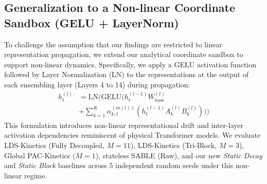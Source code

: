 \subsection{Generalization to a Non-linear Coordinate Sandbox (GELU + LayerNorm)}
To challenge the assumption that our findings are restricted to linear representation propagation, we extend our analytical coordinate sandbox to support non-linear dynamics. Specifically, we apply a GELU activation function followed by Layer Normalization (LN) to the representations at the output of each ensembling layer (Layers 4 to 14) during propagation:
\begin{equation}
\begin{aligned}
    h_t^{(l)} &= \text{LN}\Big( \text{GELU}\Big( h_t^{(l-1)} W_{\text{base}}^{(l)} \\
    &+ \sum_{k=1}^K \alpha^{(m(l))}_{k, t} \left( h_t^{(l-1)} A_k^{(l)} B_k^{(l)} \right) \Big)\Big)
\end{aligned}
\end{equation}
This formulation introduces non-linear representational drift and inter-layer activation dependencies reminiscent of physical Transformer models. We evaluate LDS-Kinetics (Fully Decoupled, $M=11$), LDS-Kinetics (Tri-Block, $M=3$), Global PAC-Kinetics ($M=1$), stateless SABLE (Raw), and our new \emph{Static Decay} and \emph{Static Block} baselines across 5 independent random seeds under this non-linear regime. 

